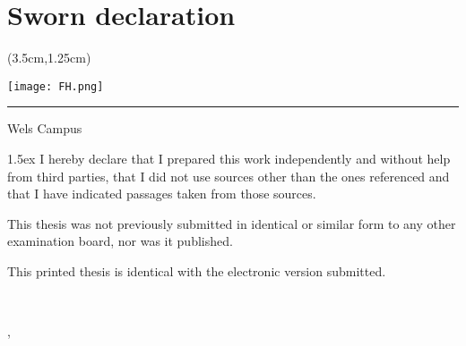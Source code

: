 

	{
	\renewcommand*\chapterheadstartvskip{\vspace*{6.5\topskip}}
	\chapter{Sworn declaration}
	}

	\begin{textblock*}{15cm}(3.5cm,1.25cm)
		\begin{flushright}
			\texttt{[image: FH.png]}
		\end{flushright}
		\rule{15cm}{0.1mm}
		\vspace{-2.2cm}
		\begin{flushright}
			Wels Campus
		\end{flushright}
	\end{textblock*}

	\vfill
	\begin{minipage}[t]{0.33\textwidth}
	\end{minipage}
	\hfill
	\begin{minipage}[t]{0.66\textwidth}
		{\parskip 1.5ex		%
			I hereby declare that I prepared this work independently and without help from third parties, that I did not use sources other than the ones referenced and that I have indicated passages taken from those sources.

            This thesis was not previously submitted in identical or similar form to any other examination board, nor was it published.

            This printed thesis is identical with the electronic version submitted.
		}
		\vspace{25mm}

		\begin{minipage}[t]{7.5cm}
			\centering \dotfill \\
		\end{minipage}
		\vskip 6pt
		\printauthor
		\vskip 6pt
		\printlocation, {\printsubmonth\ \printsubyear}
	\end{minipage}
	\vfill
